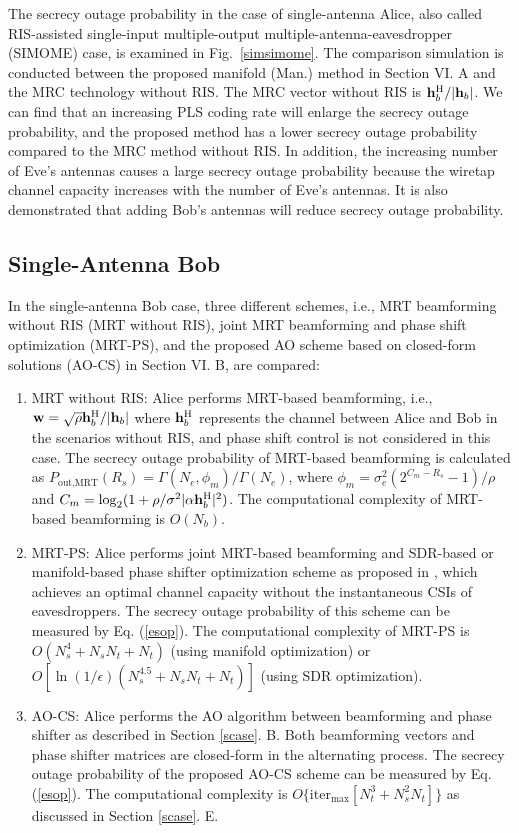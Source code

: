 \documentclass[journal]{IEEEtran}
\theoremstyle{definition}
\begin{document}
The secrecy outage probability in the case of single-antenna Alice, also called RIS-assisted single-input multiple-output multiple-antenna-eavesdropper (SIMOME) case, is examined in Fig.~\ref{simsimome}. The comparison simulation is conducted between the proposed manifold (Man.) method in Section VI. A and the MRC technology without RIS. The MRC vector without RIS is $\mathbf{h}_b^{\rm{H}}/|\mathbf{h}_b|$. We can find that an increasing PLS coding rate will enlarge the secrecy outage probability, and the proposed method has a lower secrecy outage probability compared to the MRC method without RIS. In addition, the increasing number of Eve's antennas causes a large secrecy outage probability because the wiretap channel capacity increases with the number of Eve's antennas. It is also demonstrated that adding Bob's antennas will reduce secrecy outage probability.

\subsection{Single-Antenna Bob}
In the single-antenna Bob case, three different schemes, i.e., MRT beamforming without RIS (MRT without RIS), joint MRT beamforming and phase shift optimization (MRT-PS), and the proposed AO scheme based on closed-form solutions (AO-CS) in Section VI. B, are compared:

\begin{enumerate}
\item MRT without RIS: Alice performs MRT-based beamforming, i.e., $\mathbf{w}=\sqrt{\rho}\mathbf{h}_b^{\rm{H}}/|\mathbf{h}_b|$ where $\mathbf{h}^{\rm{H}}_b$ represents the channel between Alice and Bob in the scenarios without RIS, and phase shift control is not considered in this case. The secrecy outage probability of MRT-based beamforming is calculated as $P_{\text{out,MRT}}(R_s)=\Gamma(N_e,\phi_m)/\Gamma(N_e)$, where $\phi_{m}=\sigma_e^2(2^{C_{m}-R_s}-1)/\rho$ and $C_m=\log_2(1+\rho/\sigma^2|\alpha\mathbf{h}^{\rm{H}}_b|^2)$. The computational complexity of MRT-based beamforming is $O(N_b)$.
\item MRT-PS: Alice performs joint MRT-based beamforming and SDR-based or manifold-based phase shifter optimization scheme as proposed in \cite{Wuirs2019,Hong2019,Dong2020,Wang2020}, which achieves an optimal channel capacity without the instantaneous CSIs of eavesdroppers. The secrecy outage probability of this scheme can be measured by Eq. (\ref{esop}). The computational complexity of MRT-PS is $O(N_s^4+N_sN_t+N_t)$ (using manifold optimization) or $O[\ln(1/\epsilon)(N_s^{4.5}+N_sN_t+N_t)]$ (using SDR optimization).
\item AO-CS: Alice performs the AO algorithm between beamforming and phase shifter as described in Section \ref{scase}. B. Both beamforming vectors and phase shifter matrices are closed-form in the alternating process. The secrecy outage probability of the proposed AO-CS scheme can be measured by Eq. (\ref{esop}). The computational complexity is $O\{\text{iter}_{\max}[N_t^3+N_s^2N_t]\}$ as discussed in Section \ref{scase}. E.
\end{enumerate}
\end{document}
